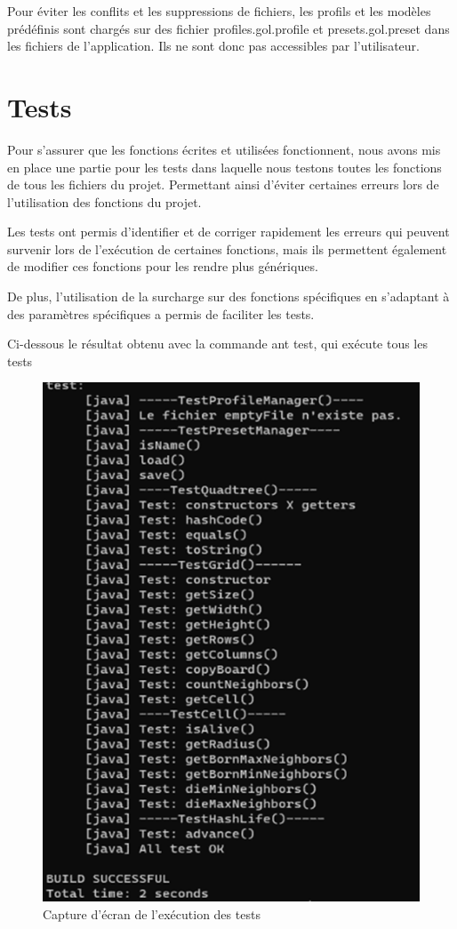 \documentclass[12pt]{article}
\begin{document}
			Pour éviter les conflits et les suppressions de fichiers, les profils et les modèles prédéfinis sont chargés sur des fichier profiles.gol.profile 
			et presets.gol.preset dans les fichiers de l'application. Ils ne sont donc pas accessibles par l'utilisateur.
			
			\section{Tests} \label{tests}
			Pour s'assurer que les fonctions écrites et utilisées fonctionnent, nous avons mis en place une partie pour les tests dans laquelle nous testons 
			toutes les fonctions de tous les fichiers du projet. Permettant ainsi d'éviter certaines erreurs lors de l'utilisation des fonctions du projet.
			
			Les tests ont permis d'identifier et de corriger rapidement les erreurs qui peuvent survenir lors de l'exécution de certaines fonctions, 
			mais ils permettent également de modifier ces fonctions pour les rendre plus génériques.
			
			De plus, l'utilisation de la surcharge sur des fonctions spécifiques en s'adaptant à des paramètres spécifiques a permis de faciliter les tests.
			
			Ci-dessous le résultat obtenu avec la commande ant test, qui exécute tous les tests
			\begin{figure}[!h]
				\centering
				\includegraphics{images/tests.png}
				\caption{Capture d'écran de l'exécution des tests}
			\end{figure}
			\newpage
			
\end{document}
